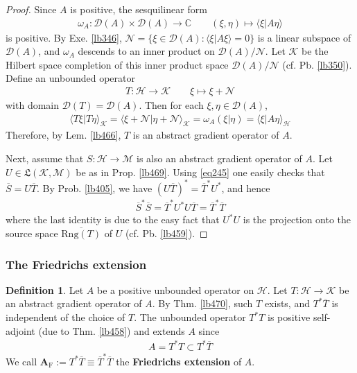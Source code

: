\documentclass[12pt,b5paper,notitlepage]{article}
\theoremstyle{definition}
\newtheorem{df}{Definition}[subsection]
\theoremstyle{plain}
\newcommand{\fk}{\mathfrak}
\newcommand{\ovl}{\overline}
\newcommand{\Dom}{\mathscr{D}}
\newcommand{\bk}[1]{\langle {#1}\rangle}
\newcommand{\scr}{\mathscr}
\newcommand{\Cbb}{\mathbb C}
\newcommand{\Rng}{\mathrm{Rng}}
\newcommand{\MH}{\mathcal H}
\newcommand{\MK}{\mathcal K}
\newcommand{\MM}{\mathcal M}
\newcommand{\Frm}{{\mathrm F}}
\numberwithin{equation}{section}
\begin{document}
\begin{proof}
Since $A$ is positive, the sesquilinear form
\begin{align*}
\omega_A:\Dom(A)\times\Dom(A)\rightarrow\Cbb\qquad (\xi,\eta)\mapsto \bk{\xi|A\eta}
\end{align*}
is positive. By Exe. \ref{lb346}, $\scr N=\{\xi\in\Dom(A):\bk{\xi|A\xi}=0\}$ is a linear subspace of $\Dom(A)$, and $\omega_A$ descends to an inner product on $\Dom(A)/\scr N$. Let $\MK$ be the Hilbert space completion of this inner product space $\Dom(A)/\scr N$ (cf. Pb. \ref{lb350}). Define an unbounded operator
\begin{align*}
T:\MH\rightarrow\MK\qquad \xi\mapsto \xi+\scr N
\end{align*}
with domain $\Dom(T)=\Dom(A)$. Then for each $\xi,\eta\in\Dom(A)$,
\begin{align*}
\bk{T\xi|T\eta}_{\MK}=\bk{\xi+\scr N|\eta+\scr N}_{\MK}=\omega_A(\xi|\eta)=\bk{\xi|A\eta}_{\MH}
\end{align*}
Therefore, by Lem. \ref{lb466}, $T$ is an abstract gradient operator of $A$.

Next, assume that $S:\MH\rightarrow\MM$ is also an abstract gradient operator of $A$. Let $U\in\fk L(\MK,\MM)$ be as in Prop. \ref{lb469}. Using \eqref{eq245} one easily checks that $\ovl S=U\ovl T$. By Prob. \ref{lb405}, we have $(U\ovl T)^*=\ovl T^*U^*$, and hence
\begin{align*}
\ovl S^*\ovl S=\ovl T^*U^*U\ovl T=\ovl T^*\ovl T
\end{align*}
where the last identity is due to the easy fact that $U^*U$ is the projection onto the source space $\ovl{\Rng(T)}$ of $U$ (cf. Pb. \ref{lb459}).
\end{proof}



\subsubsection{The Friedrichs extension}



\begin{df}\label{lb476}
Let $A$ be a positive unbounded operator on $\MH$. Let $T:\MH\rightarrow\MK$ be an abstract gradient operator of $A$. By Thm. \ref{lb470}, such $T$ exists, and $T^*\ovl T$ is independent of the choice of $T$. The unbounded operator $T^*T$ is positive self-adjoint (due to Thm. \ref{lb458}) and extends $A$ since
\begin{align*}
A=T^*T\subset T^*\ovl T
\end{align*}
We call $\pmb{A_\Frm}:=T^*\ovl T\equiv \ovl T^*\ovl T$ the \textbf{Friedrichs extension} of $A$. 
\end{df}
\end{document}
